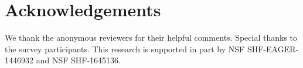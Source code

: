 \documentclass[conference]{IEEEtran}
\begin{document}
\begin{abstract}
%

\end{abstract}




















\balance
\iftrue
\section*{Acknowledgements}
We thank the anonymous reviewers for their helpful comments. Special thanks to the survey participants.
This research is supported in part by NSF SHF-EAGER-1446932 and  NSF SHF-1645136.
\fi



\end{document}
